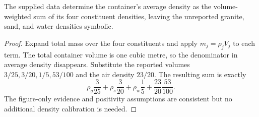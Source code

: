 \begin{theorem}
\label{thm:physics:phyx_mini_0380:target}
The supplied data determine the container's average density as the
volume-weighted sum of its four constituent densities, leaving the unreported
granite, sand, and water densities symbolic.
\end{theorem}
\begin{proof}
Expand total mass over the four constituents and apply
\(m_j=\rho_jV_j\) to each term.  The total container volume is one cubic
metre, so the denominator in average density disappears.  Substitute the
reported volumes \(3/25,3/20,1/5,53/100\) and the air density \(23/20\).
The resulting sum is exactly
\[
 \rho_g\frac3{25}+\rho_s\frac3{20}+\rho_w\frac15
   +\frac{23}{20}\frac{53}{100}.
\]
The figure-only evidence and positivity assumptions are consistent but no
additional density calibration is needed.
\end{proof}

